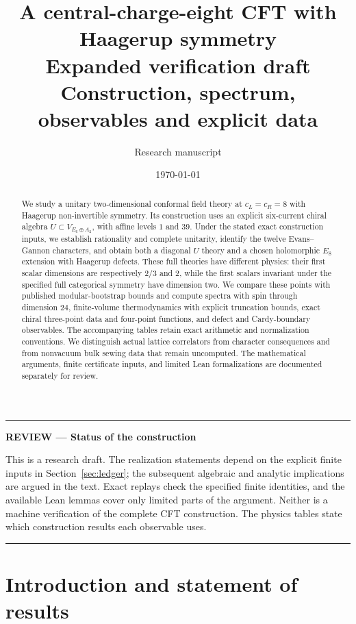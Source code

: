 \documentclass[11pt,a4paper]{article}
\title{A central-charge-eight CFT with\\[3pt]
  Haagerup symmetry\\[5pt]
  \large Expanded verification draft\\[3pt]Construction, spectrum, observables and explicit data}
\author{Research manuscript}
\date{\today}
\theoremstyle{definition}
\newenvironment{reviewnote}[1]{\par\addvspace{8pt}\begingroup
  \color{Sepia}\noindent\rule{\linewidth}{0.7pt}\par\nobreak
  \noindent\textbf{REVIEW --- #1}\par\nobreak\small\noindent\ignorespaces
}{\par\noindent\rule{\linewidth}{0.7pt}\par\endgroup\addvspace{8pt}}
\begin{document}
\maketitle
\begin{abstract}
We study a unitary two-dimensional conformal field theory at
$c_L=c_R=8$ with Haagerup non-invertible symmetry. Its construction uses
an explicit six-current chiral algebra $U\subset V_{E_6\oplus A_2}$,
with affine levels $1$ and $39$. Under the stated exact construction
inputs, we establish rationality and complete unitarity, identify the
twelve Evans--Gannon characters, and obtain both a diagonal $U$ theory
and a chosen holomorphic $E_8$ extension with Haagerup defects.
These full theories have different physics: their first scalar
dimensions are respectively $2/3$ and $2$, while the first scalars
invariant under the specified full categorical symmetry have dimension
two. We compare these points with published modular-bootstrap bounds
and compute spectra with spin through dimension $24$, finite-volume
thermodynamics with explicit truncation bounds, exact chiral three-point
data and four-point functions, and defect and Cardy-boundary observables.
The accompanying tables retain exact arithmetic and normalization
conventions. We distinguish actual lattice correlators from character
consequences and from nonvacuum bulk sewing data that remain uncomputed.
The mathematical arguments, finite certificate inputs, and limited
Lean formalizations are documented separately for review.
\end{abstract}

\begin{reviewnote}{Status of the construction}
This is a research draft. The realization statements depend on the
explicit finite inputs in Section~\ref{sec:ledger}; the subsequent
algebraic and analytic implications are argued in the text. Exact
replays check the specified finite identities, and the available Lean
lemmas cover only limited parts of the argument. Neither is a machine
verification of the complete CFT construction. The physics tables state
which construction results each observable uses.
\end{reviewnote}


\clearpage
\tableofcontents
\clearpage

\section{Introduction and statement of results}
\label{sec:statement}
\end{document}
